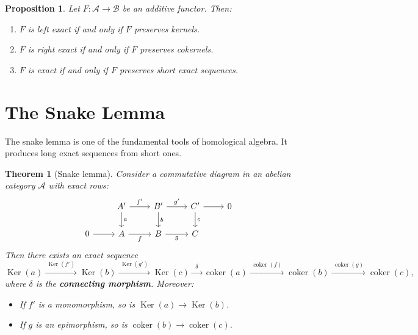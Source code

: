 \documentclass[a4paper,12pt]{book}
\DeclareMathOperator{\Ker}{Ker}
\DeclareMathOperator{\coker}{coker}
\theoremstyle{definition}
\theoremstyle{plain}
\newtheorem{theorem}[definition]{Theorem}
\newtheorem{proposition}[definition]{Proposition}
\theoremstyle{remark}
\begin{document}
\begin{proposition}\label{prop:exact-functor-les}
Let $F \colon \mathcal{A} \to \mathcal{B}$ be an additive functor. Then:
\begin{enumerate}
    \item $F$ is left exact if and only if $F$ preserves kernels.
    \item $F$ is right exact if and only if $F$ preserves cokernels.
    \item $F$ is exact if and only if $F$ preserves short exact sequences.
\end{enumerate}
\end{proposition}


\section{The Snake Lemma}\label{sec:snake-lemma}

The snake lemma is one of the fundamental tools of homological algebra. It
produces long exact sequences from short ones.

\begin{theorem}[Snake lemma]\label{thm:snake-lemma}
Consider a commutative diagram in an abelian category $\mathcal{A}$ with exact rows:
\[
\begin{tikzcd}
    & A' \arrow[r, "f'"] \arrow[d, "a"] & B' \arrow[r, "g'"] \arrow[d, "b"] & C' \arrow[r] \arrow[d, "c"] & 0 \\
    0 \arrow[r] & A \arrow[r, "f"'] & B \arrow[r, "g"'] & C &
\end{tikzcd}
\]
Then there exists an exact sequence
\[
    \Ker(a) \xrightarrow{\;\Ker(f')\;} \Ker(b) \xrightarrow{\;\Ker(g')\;} \Ker(c)
    \xrightarrow{\;\;\delta\;\;} \coker(a) \xrightarrow{\;\coker(f)\;} \coker(b)
    \xrightarrow{\;\coker(g)\;} \coker(c),
\]
where $\delta$ is the \textbf{connecting morphism}.
Moreover:
\begin{itemize}
    \item If $f'$ is a monomorphism, so is $\Ker(a) \to \Ker(b)$.
    \item If $g$ is an epimorphism, so is $\coker(b) \to \coker(c)$.
\end{itemize}
\end{theorem}
\end{document}
